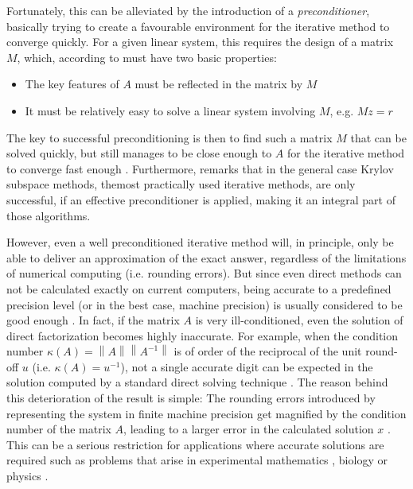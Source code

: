 Fortunately, this can be alleviated by the introduction of a \textit{preconditioner}, basically trying to create a favourable environment for the iterative method to converge quickly. For a given linear system, this requires the design of  a matrix $M$, which, according to \cite{golub_matrix_2013} must have two basic properties:
\begin{itemize}
    \item The key features of $A$ must be reflected in the matrix by $M$
    \item It must be relatively easy to solve a linear system involving $M$, e.g. $Mz=r$
\end{itemize}
The key to successful preconditioning is then to find such a matrix $M$ that can be solved quickly, but still manages to be close enough to $A$ for the iterative method to converge fast enough \cite{trefethen_numerical_1997}. Furthermore, \cite{golub_matrix_2013} remarks that in the general case Krylov subspace methods, themost practically used iterative methods, are only successful, if an effective preconditioner is applied, making it an integral part of those algorithms.

However, even a well preconditioned iterative method will, in principle, only be able to deliver an approximation of the exact answer, regardless of the limitations of numerical computing (i.e. rounding errors). But since even direct methods can not be calculated exactly on current computers, being accurate to a predefined precision level (or in the best case, machine precision) is usually considered to be good enough \cite{trefethen_numerical_1997}. In fact, if the matrix $A$ is very ill-conditioned, even the solution of direct factorization becomes highly inaccurate. For example, when the condition number $\kappa(A) = \left\| A \right\| \left\| A^{-1} \right\|$ is of order of the reciprocal of the unit round-off $u$ (i.e. $\kappa(A) = u^{-1}$), not a single accurate digit can be expected in the solution computed by a standard direct solving technique \cite{carson_new_2017}. The reason behind this deterioration of the result is simple: The rounding errors introduced by representing the system in finite machine precision get magnified by the condition number of the matrix $A$, leading to a larger error in the calculated solution $x$ \cite{buttari_mixed_2007}. 
This can be a serious restriction for applications where accurate solutions are required such as problems that arise in experimental mathematics \cite{sarra_radial_2011}, biology \cite{ma_solving_2015, ma_reliable_2017} or physics \cite{bailey_high-precision_2015}.
